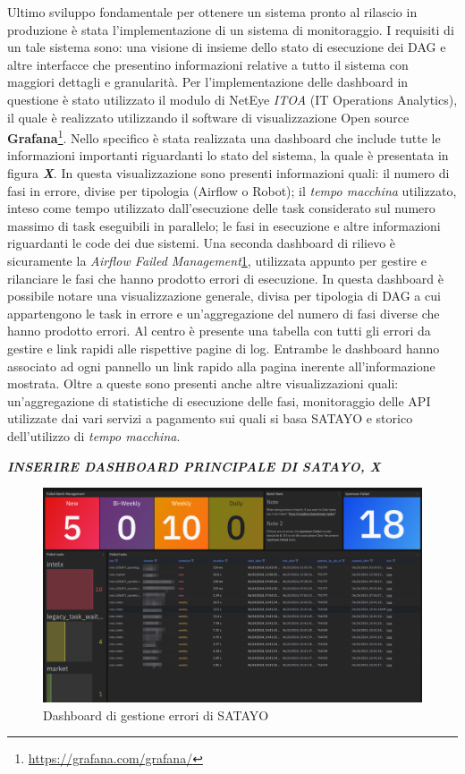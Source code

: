 Ultimo sviluppo fondamentale per ottenere un sistema pronto al rilascio in
produzione è stata l'implementazione di un sistema di monitoraggio. I requisiti di
un tale sistema sono: una visione di insieme dello stato di esecuzione dei DAG e
altre interfacce che presentino informazioni relative a tutto il sistema con
maggiori dettagli e granularità. Per l'implementazione delle dashboard in questione
è stato utilizzato il modulo di NetEye \textit{ITOA} (IT Operations Analytics), il
quale è realizzato utilizzando il software di visualizzazione Open source \textbf{Grafana}\footnote{\url{https://grafana.com/grafana/}}.
Nello specifico è stata realizzata una dashboard che include tutte le
informazioni importanti riguardanti lo stato del sistema, la quale è presentata in
figura \textbf{\textit{X}}. In questa visualizzazione sono presenti informazioni
quali: il numero di fasi in errore, divise per tipologia (Airflow o Robot); il
\textit{tempo macchina} utilizzato, inteso come tempo utilizzato dall'esecuzione
delle task considerato sul numero massimo di task eseguibili in parallelo; le fasi
in esecuzione e altre informazioni riguardanti le code dei due sistemi. Una
seconda dashboard di rilievo è sicuramente la \textit{Airflow Failed Management}\ref{fig:errors_dash},
utilizzata appunto per gestire e rilanciare le fasi che hanno prodotto errori di
esecuzione. In questa dashboard è possibile notare una visualizzazione generale,
divisa per tipologia di DAG a cui appartengono le task in errore e un'aggregazione
del numero di fasi diverse che hanno prodotto errori. Al centro è presente una
tabella con tutti gli errori da gestire e link rapidi alle rispettive pagine di
log. Entrambe le dashboard hanno associato ad ogni pannello un link rapido alla pagina
inerente all'informazione mostrata. Oltre a queste sono presenti anche altre
visualizzazioni quali: un'aggregazione di statistiche di esecuzione delle fasi,
monitoraggio delle API utilizzate dai vari servizi a pagamento sui quali si basa
SATAYO e storico dell'utilizzo di \textit{tempo macchina}.

\textbf{\textit{INSERIRE DASHBOARD PRINCIPALE DI SATAYO, X}}

\begin{figure}[htbp]
  \centering
  \includegraphics[width=.8\linewidth]{images/SATAYO_errors_dashboard.png}
  \caption{Dashboard di gestione errori di SATAYO}
  \label{fig:errors_dash}
\end{figure}